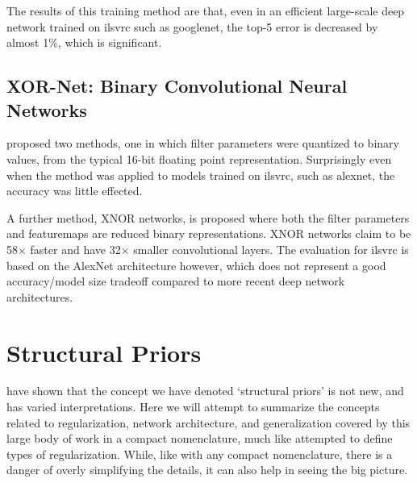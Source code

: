 \documentclass[thesis]{subfiles}
\begin{document}
	The results of this training method are that, even in an efficient large-scale deep network trained on \gls{ilsvrc} such as \gls{googlenet}, the top-5 error is decreased by almost 1\%, which is significant.
	
	\subsection{XOR-Net: Binary Convolutional Neural Networks}
	\citet{rastegari2016xnor} proposed two methods, one in which filter parameters were quantized to binary values, from the typical 16-bit floating point representation. Surprisingly even when the method was applied to models trained on \gls{ilsvrc}, such as \gls{alexnet}, the accuracy was little effected.

	A further method, XNOR networks, is proposed where both the filter parameters and \glspl{featuremap} are reduced binary representations. XNOR networks claim to be 58$\times$ faster and have 32$\times$ smaller convolutional layers. The evaluation for \gls{ilsvrc} is based on the AlexNet architecture however, which does not represent a good accuracy/model size tradeoff compared to more recent deep network architectures.
	

\section{Structural Priors}
	 have shown that the concept we have denoted `structural priors' is not new, and has varied interpretations. Here we will attempt to summarize the concepts related to regularization, network architecture, and generalization covered by this large body of work in a compact nomenclature, much like \citet{rethinking2016} attempted to define types of regularization. While, like with any compact nomenclature, there is a danger of overly simplifying the details, it can also help in seeing the big picture.
    
\end{document}
